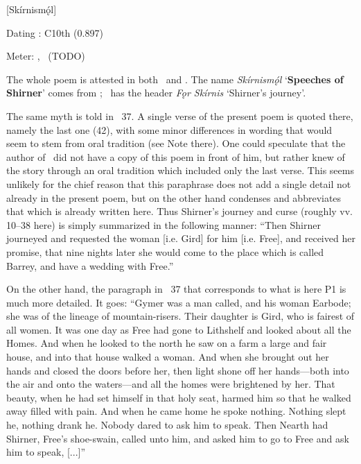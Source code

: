 [Skírnismǫ́l]

\begin{flushright}%
Dating \parencite{Sapp2022}: C10th (0.897)

Meter: \Ljodahattr, \Galdralag\ (TODO)%
\end{flushright}


The whole poem is attested in both \Regius\ and \AM. The name \emph{Skírnismǫ́l} ‘\textbf{Speeches of Shirner}’ comes from \AM; \Regius\ has the header \emph{Fǫr Skírnis} ‘Shirner’s journey’.

The same myth is told in \Gylfaginning\ 37. A single verse of the present poem is quoted there, namely the last one (42), with some minor differences in wording that would seem to stem from oral tradition (see Note there). One could speculate that the author of \Gylfaginning\ did not have a copy of this poem in front of him, but rather knew of the story through an oral tradition which included only the last verse. This seems unlikely for the chief reason that this paraphrase does not add a single detail not already in the present poem, but on the other hand condenses and abbreviates that which is already written here. Thus Shirner’s journey and curse (roughly vv. 10–38 here) is simply summarized in the following manner: “Then Shirner journeyed and requested the woman [i.e. Gird] for him [i.e. Free], and received her promise, that nine nights later she would come to the place which is called Barrey, and have a wedding with Free.”

On the other hand, the paragraph in \Gylfaginning\ 37 that corresponds to what is here P1 is much more detailed. It goes: “Gymer was a man called, and his woman Earbode; she was of the lineage of mountain-risers. Their daughter is Gird, who is fairest of all women. It was one day as Free had gone to Lithshelf and looked about all the Homes. And when he looked to the north he saw on a farm a large and fair house, and into that house walked a woman. And when she brought out her hands and closed the doors before her, then light shone off her hands—both into the air and onto the waters—and all the homes were brightened by her. That beauty, when he had set himself in that holy seat, harmed him so that he walked away filled with pain. And when he came home he spoke nothing. Nothing slept he, nothing drank he. Nobody dared to ask him to speak. Then Nearth had Shirner, Free’s shoe-swain, called unto him, and asked him to go to Free and ask him to speak, [...]”

